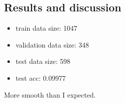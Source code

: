 \documentclass{article}
\begin{document}
\subsection*{Results and discussion}

\begin{itemize}
    \item train data size: 1047
    \item validation data size: 348
    \item test data size: 598
    \item test acc: 0.09977
\end{itemize}

More smooth than I expected.


\newpage

%
%

\newpage
\appendix
\end{document}
